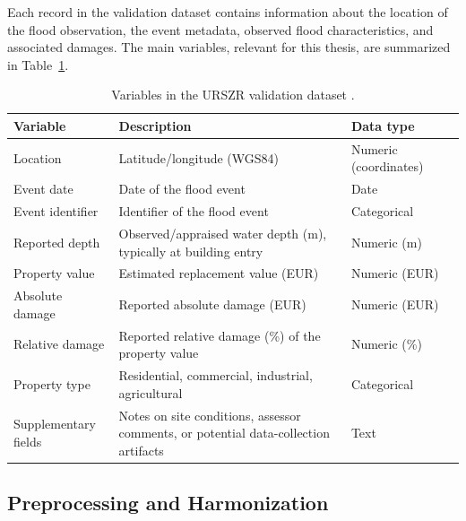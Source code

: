 Each record in the validation dataset contains information about the location of the flood observation, the event metadata, observed flood characteristics, and associated damages. The main variables, relevant for this thesis, are summarized in Table~\ref{tab:validation-dataset-variables}.

\begin{table}[htb]
\centering
\caption{Variables in the URSZR validation dataset \cite{urszr_damage_data}.}
\label{tab:validation-dataset-variables}
\begin{tabular}{|p{3.2cm}|p{5.5cm}|p{2.2cm}|p{2.2cm}|}
\hline
\textbf{Variable} & \textbf{Description} & \textbf{Data type} \\
\hline
Location & Latitude/longitude (WGS84) & Numeric (coordinates) \\
\hline
Event date & Date of the flood event & Date  \\
\hline
Event identifier & Identifier of the flood event & Categorical \\
\hline
Reported depth & Observed/appraised water depth (m), typically at building entry & Numeric (m) \\
\hline
Property value & Estimated replacement value (EUR) & Numeric (EUR) \\
\hline
Absolute damage & Reported absolute damage (EUR) & Numeric (EUR) \\
\hline
Relative damage & Reported relative damage (\%) of the property value & Numeric (\%) \\
\hline
Property type & Residential, commercial, industrial, agricultural & Categorical \\
\hline
Supplementary fields & Notes on site conditions, assessor comments, or potential data-collection artifacts & Text \\
\hline
\end{tabular}
\end{table}

\subsection{Preprocessing and Harmonization}

